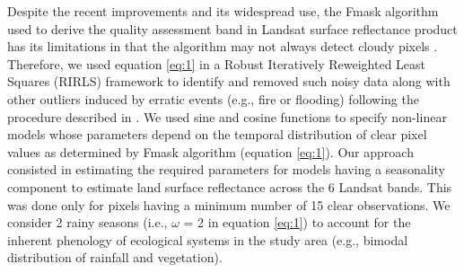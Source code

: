 \documentclass[12pt,oneside,preprint,3p,authoryear,times]{elsarticle} %
\begin{document}
Despite the recent improvements and its widespread use, the Fmask
algorithm used to derive the quality assessment band in Landsat surface
reflectance product has its limitations in that the algorithm may not
always detect cloudy pixels
\citep{Zhu-et-al-2015, Zhu-and-Woodcock-2014}. Therefore, we used
equation \eqref{eq:1} in a Robust Iteratively Reweighted Least Squares
(RIRLS) framework to identify and removed such noisy data along with
other outliers induced by erratic events (e.g., fire or flooding)
following the procedure described in \citet{Zhu-and-Woodcock-2014}. We
used sine and cosine functions to specify non-linear models whose
parameters depend on the temporal distribution of clear pixel values as
determined by Fmask algorithm (equation \eqref{eq:1}). Our approach
consisted in estimating the required parameters for models having a
seasonality component to estimate land surface reflectance across the 6
Landsat bands. This was done only for pixels having a minimum number of
15 clear observations. We consider 2 rainy seasons (i.e., \(\omega\) = 2
in equation \eqref{eq:1}) to account for the inherent phenology of
ecological systems in the study area (e.g., bimodal distribution of
rainfall and vegetation).
\end{document}
